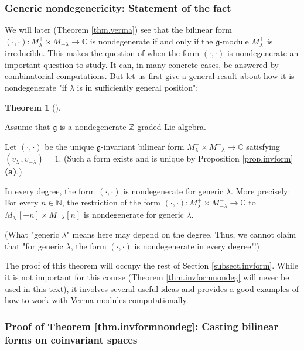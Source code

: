\documentclass
[numbers=enddot,12pt,final,onecolumn,german,notitlepage]{scrartcl}%
\theoremstyle{definition}
\newtheorem{theo}{Theorem}
\newenvironment{theorem}[1][]
{\begin{theo}[#1]\begin{leftbar}}
{\end{leftbar}\end{theo}}
\begin{document}
\subsubsection{Generic nondegenericity: Statement of the fact}

We will later (Theorem \ref{thm.verma}) see that the bilinear form $\left(
\cdot,\cdot\right)  :M_{\lambda}^{+}\times M_{-\lambda}^{-}\rightarrow
\mathbb{C}$ is nondegenerate if and only if the $\mathfrak{g}$-module
$M_{\lambda}^{+}$ is irreducible. This makes the question of when the form
$\left(  \cdot,\cdot\right)  $ is nondegenerate an important question to
study. It can, in many concrete cases, be answered by combinatorial
computations. But let us first give a general result about how it is
nondegenerate "if $\lambda$ is in sufficiently general position":

\begin{theorem}
\label{thm.invformnondeg}Assume that $\mathfrak{g}$ is a nondegenerate
$\mathbb{Z}$-graded Lie algebra.

Let $\left(  \cdot,\cdot\right)  $ be the unique $\mathfrak{g}$-invariant
bilinear form $M_{\lambda}^{+}\times M_{-\lambda}^{-}\rightarrow\mathbb{C}$
satisfying $\left(  v_{\lambda}^{+},v_{-\lambda}^{-}\right)  =1$. (Such a form
exists and is unique by Proposition \ref{prop.invform} \textbf{(a)}.)

In every degree, the form $\left(  \cdot,\cdot\right)  $ is nondegenerate for
generic $\lambda$. More precisely: For every $n\in\mathbb{N}$, the restriction
of the form $\left(  \cdot,\cdot\right)  :M_{\lambda}^{+}\times M_{-\lambda
}^{-}\rightarrow\mathbb{C}$ to $M_{\lambda}^{+}\left[  -n\right]  \times
M_{-\lambda}^{-}\left[  n\right]  $ is nondegenerate for generic $\lambda$.

(What "generic $\lambda$" means here may depend on the degree. Thus, we cannot
claim that "for generic $\lambda$, the form $\left(  \cdot,\cdot\right)  $ is
nondegenerate in every degree"!)
\end{theorem}

The proof of this theorem will occupy the rest of Section
\ref{subsect.invform}. While it is not important for this course (Theorem
\ref{thm.invformnondeg} will never be used in this text), it involves several
useful ideas and provides a good examples of how to work with Verma modules computationally.

\subsubsection{Proof of Theorem \ref{thm.invformnondeg}: Casting bilinear
forms on coinvariant spaces}
\end{document}
